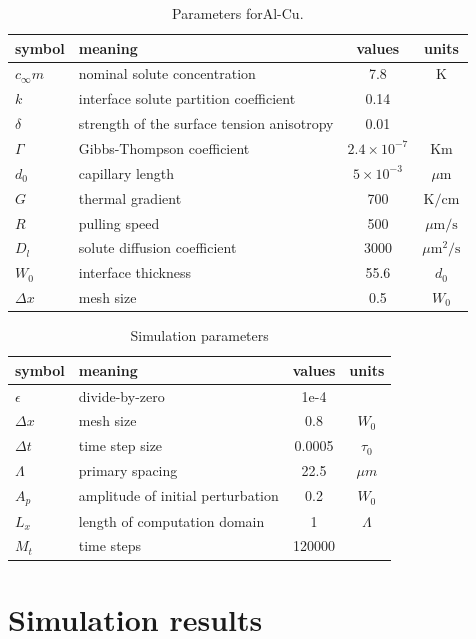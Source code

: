 \documentclass[a4paper,12pt]{article}
\begin{document}
\begin{table}
\centering
\caption{Parameters forAl-Cu.}
\begin{tabular}{l l c c }
\toprule
symbol & meaning & values & units \\
\midrule
$c_{\infty}m$ & nominal solute concentration &  7.8 & K \\
$k$ & interface solute partition coefficient & 0.14 &\\
$\delta$ & strength of the surface tension anisotropy  &  0.01  &\\
$\Gamma$ & Gibbs-Thompson coefficient & $2.4\times 10^{-7}$ & Km \\
$d_0$ & capillary length & $ 5\times10^{-3}$  & $\mu$m \\
$G$ & thermal gradient & 700 & $\text{K} / \text{cm}$ \\
$R$ & pulling speed &  500 & $\mu \text{m} / \text{s}$ \\
$D_l$ & solute diffusion coefficient &$3000$ &  ${\mu\text{m}}^2/\text{s}$ \\
$W_0$ & interface thickness  & 55.6  & $d_0$ \\
$\Delta x$ & mesh size & 0.5 & $W_0$ \\
\bottomrule
\end{tabular}\label{tab:AlCu}

\end{table}


\begin{table}
\centering
\caption{Simulation parameters}
\begin{tabular}{l l c c }
\toprule
symbol & meaning & values & units \\
\midrule
$\epsilon$ & divide-by-zero  & 1e-4  &\\
$\Delta x$ & mesh size & 0.8 & $W_0$ \\
$\Delta t$ & time step size& 0.0005& $\tau_0$ \\
$\Lambda$ & primary spacing & 22.5 & $\mu m$ \\
$A_p$ & amplitude of initial perturbation& 0.2 & $W_0$\\
$L_x$ & length of computation domain  &  1  & $\Lambda$\\
$M_t$ & time steps& 120000 & \\
\bottomrule
\end{tabular}
\end{table}

\section{Simulation results}
\end{document}
